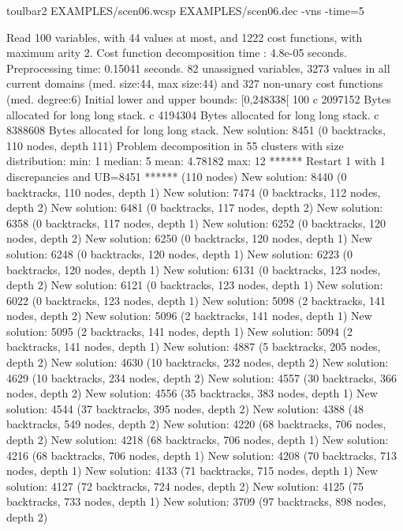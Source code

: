 \begin{enumerate}
\begin{DoxyCode}
	toulbar2 EXAMPLES/scen06.wcsp EXAMPLES/scen06.dec -vns -time=5
\end{DoxyCode}
{\scriptsize
\begin{DoxyCode}
Read 100 variables, with 44 values at most, and 1222 cost functions, with maximum arity 2.
Cost function decomposition time : 4.8e-05 seconds.
Preprocessing time: 0.15041 seconds.
82 unassigned variables, 3273 values in all current domains (med. size:44, max size:44) and 327 non-unary cost functions (med. degree:6)
Initial lower and upper bounds: [0,248338[ 100%
c 2097152 Bytes allocated for long long stack.
c 4194304 Bytes allocated for long long stack.
c 8388608 Bytes allocated for long long stack.
New solution: 8451 (0 backtracks, 110 nodes, depth 111)
Problem decomposition in 55 clusters with size distribution: min: 1 median: 5 mean: 4.78182 max: 12
****** Restart 1 with 1 discrepancies and UB=8451 ****** (110 nodes)
New solution: 8440 (0 backtracks, 110 nodes, depth 1)
New solution: 7474 (0 backtracks, 112 nodes, depth 2)
New solution: 6481 (0 backtracks, 117 nodes, depth 2)
New solution: 6358 (0 backtracks, 117 nodes, depth 1)
New solution: 6252 (0 backtracks, 120 nodes, depth 2)
New solution: 6250 (0 backtracks, 120 nodes, depth 1)
New solution: 6248 (0 backtracks, 120 nodes, depth 1)
New solution: 6223 (0 backtracks, 120 nodes, depth 1)
New solution: 6131 (0 backtracks, 123 nodes, depth 2)
New solution: 6121 (0 backtracks, 123 nodes, depth 1)
New solution: 6022 (0 backtracks, 123 nodes, depth 1)
New solution: 5098 (2 backtracks, 141 nodes, depth 2)
New solution: 5096 (2 backtracks, 141 nodes, depth 1)
New solution: 5095 (2 backtracks, 141 nodes, depth 1)
New solution: 5094 (2 backtracks, 141 nodes, depth 1)
New solution: 4887 (5 backtracks, 205 nodes, depth 2)
New solution: 4630 (10 backtracks, 232 nodes, depth 2)
New solution: 4629 (10 backtracks, 234 nodes, depth 2)
New solution: 4557 (30 backtracks, 366 nodes, depth 2)
New solution: 4556 (35 backtracks, 383 nodes, depth 1)
New solution: 4544 (37 backtracks, 395 nodes, depth 2)
New solution: 4388 (48 backtracks, 549 nodes, depth 2)
New solution: 4220 (68 backtracks, 706 nodes, depth 2)
New solution: 4218 (68 backtracks, 706 nodes, depth 1)
New solution: 4216 (68 backtracks, 706 nodes, depth 1)
New solution: 4208 (70 backtracks, 713 nodes, depth 1)
New solution: 4133 (71 backtracks, 715 nodes, depth 1)
New solution: 4127 (72 backtracks, 724 nodes, depth 2)
New solution: 4125 (75 backtracks, 733 nodes, depth 1)
New solution: 3709 (97 backtracks, 898 nodes, depth 2)

\end{DoxyCode}}
\end{enumerate}

